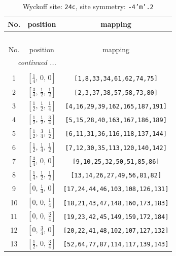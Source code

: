 \documentclass[fleqn,8pt]{jsarticle}
\begin{document}
\begin{longtable}{ccc}
\caption{Wyckoff site: {\tt 24c}, site symmetry: {\tt -4'm'.2}}
 \\
 \hline \hline
No. & position & mapping \\ \hline \endfirsthead

\multicolumn{2}{l}{\tablename\ \thetable{}} \\
 \hline \hline
No. & position & mapping \\ \hline \endhead

 \hline \hline
\multicolumn{2}{r}{\footnotesize\it continued ...} \\ \endfoot

 \hline \hline
\multicolumn{2}{r}{} \\ \endlastfoot

1 & $\left[ \frac{1}{4},\, 0,\, 0 \right]$ & {\tt [1,8,33,34,61,62,74,75]} \\ \hline
2 & $\left[ \frac{3}{4},\, \frac{1}{2},\, \frac{1}{2} \right]$ & {\tt [2,3,37,38,57,58,73,80]} \\ \hline
3 & $\left[ \frac{1}{2},\, \frac{1}{2},\, \frac{1}{4} \right]$ & {\tt [4,16,29,39,162,165,187,191]} \\ \hline
4 & $\left[ \frac{1}{2},\, \frac{1}{2},\, \frac{3}{4} \right]$ & {\tt [5,15,28,40,163,167,186,189]} \\ \hline
5 & $\left[ \frac{1}{2},\, \frac{3}{4},\, \frac{1}{2} \right]$ & {\tt [6,11,31,36,116,118,137,144]} \\ \hline
6 & $\left[ \frac{1}{2},\, \frac{1}{4},\, \frac{1}{2} \right]$ & {\tt [7,12,30,35,113,120,140,142]} \\ \hline
7 & $\left[ \frac{3}{4},\, 0,\, 0 \right]$ & {\tt [9,10,25,32,50,51,85,86]} \\ \hline
8 & $\left[ \frac{1}{4},\, \frac{1}{2},\, \frac{1}{2} \right]$ & {\tt [13,14,26,27,49,56,81,82]} \\ \hline
9 & $\left[ 0,\, \frac{1}{4},\, 0 \right]$ & {\tt [17,24,44,46,103,108,126,131]} \\ \hline
10 & $\left[ 0,\, 0,\, \frac{1}{4} \right]$ & {\tt [18,21,43,47,148,160,173,183]} \\ \hline
11 & $\left[ 0,\, 0,\, \frac{3}{4} \right]$ & {\tt [19,23,42,45,149,159,172,184]} \\ \hline
12 & $\left[ 0,\, \frac{3}{4},\, 0 \right]$ & {\tt [20,22,41,48,102,107,127,132]} \\ \hline
13 & $\left[ \frac{1}{2},\, 0,\, \frac{3}{4} \right]$ & {\tt [52,64,77,87,114,117,139,143]} \\ \hline

\end{longtable}
\end{document}
